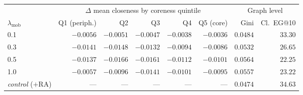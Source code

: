 \begin{tabular}{lrrrrrrr}
\toprule
 & \multicolumn{5}{c}{$\Delta$ mean closeness by coreness quintile} & \multicolumn{2}{c}{Graph level} \\
\cmidrule(lr){2-6}\cmidrule(lr){7-8}
$\lambda_{\mathrm{mob}}$ & Q1 (periph.) & Q2 & Q3 & Q4 & Q5 (core) & Gini & Cl.\ EG@10 \\
\midrule
0.1 & $-0.0056$ & $-0.0051$ & $-0.0047$ & $-0.0038$ & $-0.0036$ & $0.0484$ & $33.30$ \\
0.3 & $-0.0141$ & $-0.0148$ & $-0.0132$ & $-0.0094$ & $-0.0086$ & $0.0532$ & $26.65$ \\
0.5 & $-0.0137$ & $-0.0166$ & $-0.0161$ & $-0.0112$ & $-0.0101$ & $0.0564$ & $22.25$ \\
1.0 & $-0.0057$ & $-0.0096$ & $-0.0141$ & $-0.0101$ & $-0.0095$ & $0.0557$ & $23.22$ \\
\midrule
\emph{control} ($+$RA) & --- & --- & --- & --- & --- & $0.0474$ & $34.63$ \\
\bottomrule
\end{tabular}
